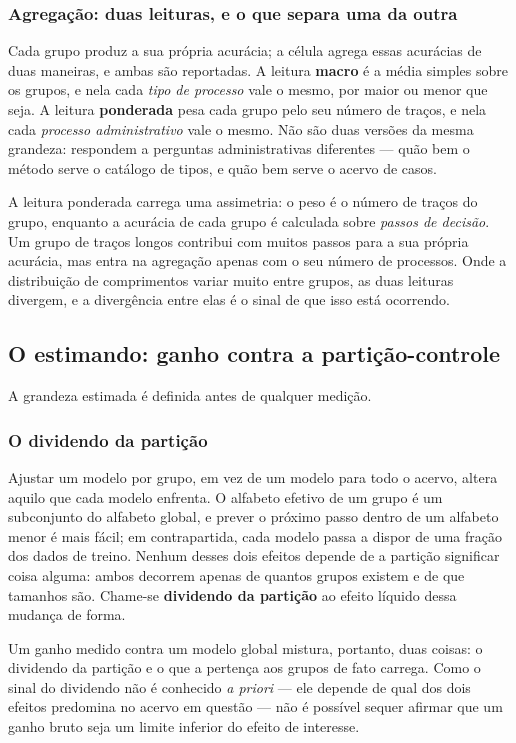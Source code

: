 \subsubsection*{Agregação: duas leituras, e o que separa uma da outra}

Cada grupo produz a sua própria acurácia; a célula agrega essas acurácias de duas maneiras, e ambas
são reportadas. A leitura \textbf{macro} é a média simples sobre os grupos, e nela cada \emph{tipo de
processo} vale o mesmo, por maior ou menor que seja. A leitura \textbf{ponderada} pesa cada grupo
pelo seu número de traços, e nela cada \emph{processo administrativo} vale o mesmo. Não são duas
versões da mesma grandeza: respondem a perguntas administrativas diferentes --- quão bem o método
serve o catálogo de tipos, e quão bem serve o acervo de casos.

A leitura ponderada carrega uma assimetria: o peso é o número de traços do grupo,
enquanto a acurácia de cada grupo é calculada sobre \emph{passos de decisão}. Um grupo de traços
longos contribui com muitos passos para a sua própria acurácia, mas entra na agregação apenas com o
seu número de processos. Onde a distribuição de comprimentos variar muito entre grupos, as duas
leituras divergem, e a divergência entre elas é o sinal de que isso está ocorrendo.

\subsection{O estimando: ganho contra a partição-controle}\label{sec:estimando}

A grandeza estimada é definida antes de qualquer medição.

\subsubsection*{O dividendo da partição}

Ajustar um modelo por grupo, em vez de um modelo para todo o acervo, altera aquilo que cada modelo
enfrenta. O alfabeto efetivo de um grupo é um subconjunto do alfabeto global, e prever o próximo
passo dentro de um alfabeto menor é mais fácil; em contrapartida, cada modelo passa a dispor de uma
fração dos dados de treino. Nenhum desses dois efeitos depende de a partição significar coisa
alguma: ambos decorrem apenas de quantos grupos existem e de que tamanhos são. Chame-se
\textbf{dividendo da partição} ao efeito líquido dessa mudança de forma.

Um ganho medido contra um modelo global mistura, portanto, duas coisas: o dividendo da partição e o
que a pertença aos grupos de fato carrega. Como o sinal do dividendo não é conhecido \emph{a
priori} --- ele depende de qual dos dois efeitos predomina no acervo em questão --- não é possível
sequer afirmar que um ganho bruto seja um limite inferior do efeito de interesse.

